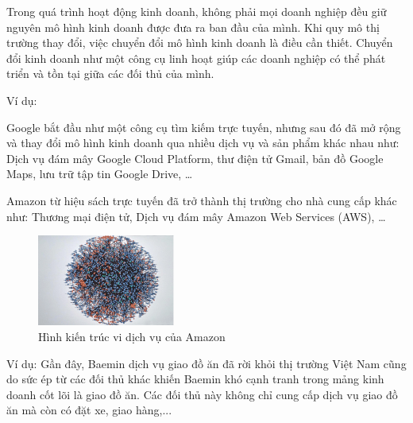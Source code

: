 Trong quá trình hoạt động kinh doanh, không phải mọi doanh nghiệp đều giữ nguyên mô hình kinh doanh được đưa ra ban đầu của mình. Khi quy mô thị trường thay đổi, việc chuyển đổi mô hình kinh doanh là điều cần thiết. Chuyển đổi kinh doanh như một công cụ linh hoạt giúp các doanh nghiệp có thể phát triển và tồn tại giữa các đối thủ của mình.

Ví dụ:

Google bắt đầu như một công cụ tìm kiếm trực tuyến, nhưng sau đó đã mở rộng và thay đổi mô hình kinh doanh qua nhiều dịch vụ và sản phẩm khác nhau như: Dịch vụ đám mây Google Cloud Platform, thư điện tử Gmail, bản đồ Google Maps, lưu trữ tập tin Google Drive, \dots

Amazon từ hiệu sách trực tuyến đã trở thành thị trường cho nhà cung cấp khác như: Thương mại điện tử, Dịch vụ đám mây Amazon Web Services (AWS), \dots


\begin{figure}[h]

\centering

\includegraphics[height = 3cm]{pictures/KienTrucViDichVuAmazon.png}

\caption{Hình kiến trúc vi dịch vụ của Amazon}

\end{figure}



Ví dụ: Gần đây, Baemin dịch vụ giao đồ ăn đã rời khỏi thị trường Việt Nam cũng do sức ép từ các đối thủ khác khiến Baemin khó cạnh tranh trong mảng kinh doanh cốt lõi là giao đồ ăn. Các đối thủ này không chỉ cung cấp dịch vụ giao đồ ăn mà còn có đặt xe, giao hàng,...





